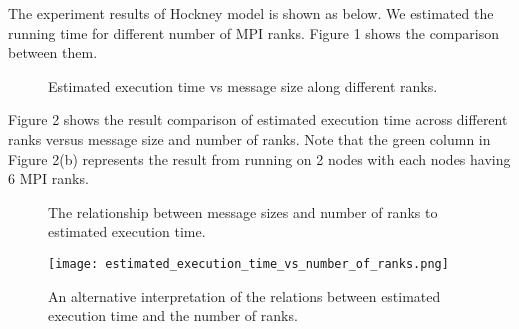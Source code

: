 The experiment results of Hockney model is shown as below. We estimated the running time for different number of MPI ranks. Figure 1 shows the comparison between them.

\begin{figure*}[h]
\centering
\hspace*{\fill}
\hspace*{\fill}
\hspace{0mm}
\hspace*{\fill}
\hspace{0mm}
\hspace*{\fill}
\caption{Estimated execution time vs message size along different ranks.}
\end{figure*}

Figure 2 shows the result comparison of estimated execution time across different ranks versus message size and number of ranks. Note that the green column in Figure 2(b) represents the result from running on 2 nodes with each nodes having 6 MPI ranks.

\begin{figure*}[h!]
\hspace{0mm}
\hspace*{\fill}
\caption{The relationship between message sizes and number of ranks to estimated execution time.}
\end{figure*}


\begin{figure}[h]
\texttt{[image: estimated\_execution\_time\_vs\_number\_of\_ranks.png]}
\caption{An alternative interpretation of the relations between estimated execution time and the number of ranks.}
\end{figure}